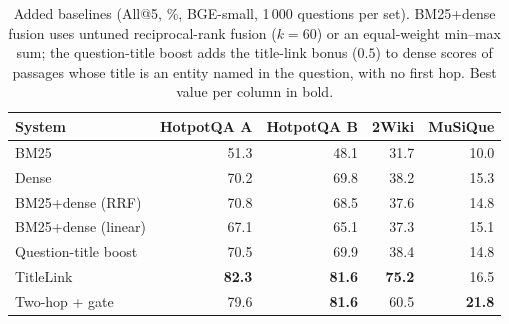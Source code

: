 \begin{table}[t]
\centering
\small
\caption{Added baselines (All@5, \%, BGE-small, 1\,000 questions per set). BM25+dense fusion uses untuned reciprocal-rank fusion ($k=60$) or an equal-weight min--max sum; the question-title boost adds the title-link bonus ($0.5$) to dense scores of passages whose title is an entity named in the question, with no first hop. Best value per column in bold.}
\label{tab:r6base}
\begin{tabular}{lrrrr}
\toprule
System & HotpotQA A & HotpotQA B & 2Wiki & MuSiQue \\
\midrule
BM25 & 51.3 & 48.1 & 31.7 & 10.0 \\
Dense & 70.2 & 69.8 & 38.2 & 15.3 \\
BM25+dense (RRF) & 70.8 & 68.5 & 37.6 & 14.8 \\
BM25+dense (linear) & 67.1 & 65.1 & 37.3 & 15.1 \\
Question-title boost & 70.5 & 69.9 & 38.4 & 14.8 \\
TitleLink & \textbf{82.3} & \textbf{81.6} & \textbf{75.2} & 16.5 \\
Two-hop + gate & 79.6 & \textbf{81.6} & 60.5 & \textbf{21.8} \\
\bottomrule
\end{tabular}
\end{table}
